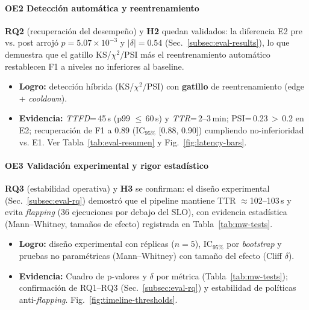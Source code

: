 \paragraph{OE2 \;\textemdash\; Detección automática y reentrenamiento}
\textbf{RQ2} (recuperación del desempeño) y \textbf{H2} quedan validados: la diferencia E2 pre vs. post arrojó $p=5.07\times 10^{-3}$ y $|\delta|=0.54$ (Sec.~\ref{subsec:eval-results}), lo que demuestra que el gatillo KS/$\chi^2$/PSI más el reentrenamiento automático restablecen F1 a niveles no inferiores al baseline.
\begin{itemize}\setlength\itemsep{2pt}
  \item \textbf{Logro:} detección híbrida (KS/$\chi^2$/PSI) con \textbf{gatillo} de reentrenamiento (edge + \textit{cooldown}).
  \item \textbf{Evidencia:} \textit{TTFD}=\,45\,s (p99 $\le$\,60\,s) y \textit{TTR}=\,2--3\,min; PSI=\,0.23\,$>$\,0.2 en E2; recuperación de F1 a 0.89 (IC$_{95\%}$ [0.88, 0.90]) cumpliendo no-inferioridad vs. E1. Ver Tabla~\ref{tab:eval-resumen} y Fig.~\ref{fig:latency-bars}.
\end{itemize}

\paragraph{OE3 \;\textemdash\; Validación experimental y rigor estadístico}
\textbf{RQ3} (estabilidad operativa) y \textbf{H3} se confirman: el diseño experimental (Sec.~\ref{subsec:eval-rq}) demostró que el pipeline mantiene TTR $\approx$102--103\,s y evita \textit{flapping} (36 ejecuciones por debajo del SLO), con evidencia estadística (Mann–Whitney, tamaños de efecto) registrada en Tabla~\ref{tab:mw-tests}.
\begin{itemize}\setlength\itemsep{2pt}
  \item \textbf{Logro:} diseño experimental con réplicas ($n=5$), IC$_{95\%}$ por \textit{bootstrap} y pruebas no paramétricas (Mann--Whitney) con tamaño del efecto (Cliff $\delta$).
  \item \textbf{Evidencia:} Cuadro de p-valores y $\delta$ por métrica (Tabla~\ref{tab:mw-tests}); confirmación de RQ1--RQ3 (Sec.~\ref{subsec:eval-rq}) y estabilidad de políticas anti-\textit{flapping}. Fig.~\ref{fig:timeline-thresholds}.
\end{itemize}

